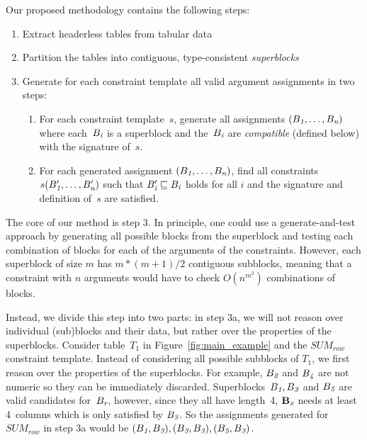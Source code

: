 Our proposed methodology contains the following steps:
\begin{enumerate}
\item Extract headerless tables from tabular data
\item Partition the tables into contiguous, type-consistent \textit{superblocks}
\item Generate for each constraint template all valid argument assignments in two steps:
\begin{enumerate}
\item For each constraint template~$s$, generate all assignments $(B_{\textit{1}}, \ldots ,B_{\textit{n}})$ where each~$B_{\textit{i}}$ is a superblock and the~$B_{\textit{i}}$ are \textit{compatible} (defined below) with the signature of~$s$. 
\item For each generated assignment $(B_{\textit{1}}, \ldots ,B_{\textit{n}})$, find all constraints $s(B'_{\textit{1}}, \ldots, B'_{\textit{n}})$ such that $B'_{\textit{i}} \sqsubseteq B_{\textit{i}}$ holds for all $i$ and the signature and definition of~$s$ are satisfied.
\end{enumerate}
\end{enumerate}

The core of our method is step 3. In principle, one could use a generate-and-test approach by generating all possible blocks from the superblock and testing each combination of blocks for each of the arguments of the constraints. However, each superblock of size $m$ has $m*(m+1)/2$ contiguous subblocks, meaning that a constraint with $n$ arguments would have to check $O(n^{m^2})$ combinations of blocks.

Instead, we divide this step into two parts: in step 3a, we will not reason over individual (sub)blocks and their data, but rather over the properties of the superblocks.
Consider table~$T_1$ in Figure~\ref{fig:main_example} and the $\textit{SUM}_{row}$ constraint template.
Instead of considering all possible subblocks of $T_1$, we first reason over the properties of the superblocks.
For example, $B_{\textit{2}}$ and $B_{\textit{4}}$ are not numeric so they can be immediately discarded.
Superblocks~$B_{\textit{1}}, B_{\textit{3}}$ and $B_{\textit{5}}$ are valid candidates for~$B_{\textit{r}}$, however, since they all have length~4, $\mathbf{B_{\textit{x}}}$ needs at least 4~columns which is only satisfied by $B_{\textit{3}}$.
So the assignments generated for $\textit{SUM}_{row}$ in step 3a would be $(B_{\textit{1}}, B_{\textit{3}}), (B_{\textit{3}}, B_{\textit{3}}), (B_{\textit{5}}, B_{\textit{3}})$.

